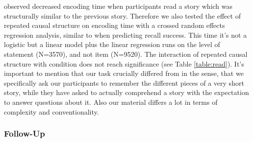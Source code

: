 \documentclass[a4paper,man,natbib,floatsintext,import]{apa6}
\begin{document}
\cite{Day2007} observed decreased encoding time when participants read a story which was structurally similar to the previous story. Therefore we also tested the effect of repeated causal structure on encoding time with a crossed random effects regression analysis, similar to when predicting recall success. This time it's not a logistic but a linear model plus the linear regression runs on the level of statement (N=3570), and not item (N=9520). The interaction of repeated causal structure with condition does not reach significance (see Table \ref{table:read}). It's important to mention that our task crucially differed from \cite{Day2007} in the sense, that we specifically ask our participants to remember the different pieces of a very short story, while they have asked to actually comprehend a story with the expectation to answer questions about it. Also our material differs a lot in terms of complexity and conventionality.



\subsubsection{Follow-Up}
\end{document}
